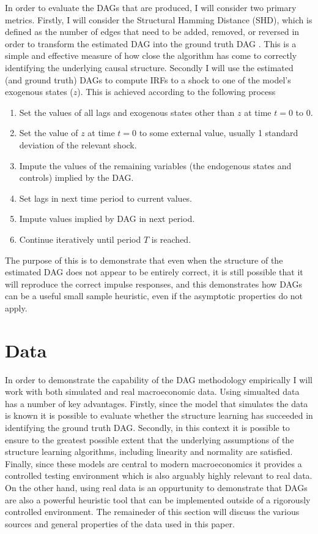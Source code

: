 \documentclass{article}
\begin{document}
In order to evaluate the DAGs that are produced, I will consider two primary metrics. Firstly, I will consider the Structural Hamming Distance (SHD), which is defined as the number of edges that need to be added, removed, or reversed in order to transform the estimated DAG into the ground truth DAG \parencite{tsamardinos2006max}. This is a simple and effective measure of how close the algorithm has come to correctly identifying the underlying causal structure. Secondly I will use the estimated (and ground truth) DAGs to compute IRFs to a shock to one of the model's exogenous states ($z$). This is achieved according to the following process

\begin{enumerate}
  \item Set the values of all lags and exogenous states other than $z$ at time $t=0$ to 0.
  \item Set the value of $z$ at time $t=0$ to some external value, usually 1 standard deviation of the relevant shock.
  \item Impute the values of the remaining variables (the endogenous states and controls) implied by the DAG.
  \item Set lags in next time period to current values.
  \item Impute values implied by DAG in next period.
  \item Continue iteratively until period $T$ is reached.
\end{enumerate}

The purpose of this is to demonstrate that even when the structure of the estimated DAG does not appear to be entirely correct, it is still possible that it will reproduce the correct impulse responses, and this demonstrates how DAGs can be a useful small sample heuristic, even if the asymptotic properties do not apply.

\section{Data}

In order to demonstrate the capability of the DAG methodology empirically I will work with both simulated and real macroeconomic data. Using simualted data has a number of key advantages. Firstly, since the model that simulates the data is known it is possible to evaluate whether the structure learning has succeeded in identifying the ground truth DAG. Secondly, in this context it is possible to ensure to the greatest possible extent that the underlying assumptions of the structure learning algorithms, including linearity and normality are satisfied. Finally, since these models are central to modern macroeconomics it provides a controlled testing environment which is also arguably highly relevant to real data. On the other hand, using real data is an oppurtunity to demonstrate that DAGs are also a powerful heuristic tool that can be implemented outside of a rigorously controlled environment. The remaineder of this section will discuss the various sources and general properties of the data used in this paper.
\end{document}
